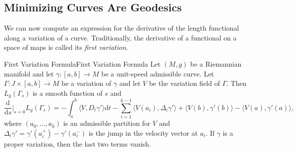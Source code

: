 \documentclass[../main.tex]{subfiles}
\begin{document}
\subsection{Minimizing Curves Are Geodesics}
We can now compute an expression for the derivative of the length functional along a variation of a curve. Traditionally, the derivative of a functional on a space of maps is called its \emph{first variation}.

\begin{theorem}{First Variation Formula}{First Variation Formula}
  Let $(M,g)$ be a Riemannian manifold and let $\gamma: [a,b] \to M$ be a unit-speed admissible curve. Let $\Gamma: J \times [a,b] \to M$ be a variation of $\gamma$ and let $V$ be the variation field of $\Gamma$. Then $L_g(\Gamma_s)$ is a smooth function of $s$ and
  \begin{equation}
    \frac{\mathrm{d}}{\mathrm{d} s} \bigg|_{s=0} L_g(\Gamma_s) = -\int_a^b \langle V, D_t \gamma' \rangle \mathrm{d} t - \sum_{i=1}^{k-1} \langle V(a_i), \Delta_i \gamma' \rangle + \langle V(b), \gamma'(b) \rangle - \langle V(a), \gamma'(a) \rangle,
  \end{equation}
  where $(a_0, \ldots, a_k)$ is an admissible partition for $V$ and $\Delta_i \gamma' = \gamma'(a_i^+) - \gamma'(a_i^-)$ is the jump in the velocity vector at $a_i$. If $\gamma$ is a proper variation, then the last two terms vanish.
\end{theorem}
\end{document}
